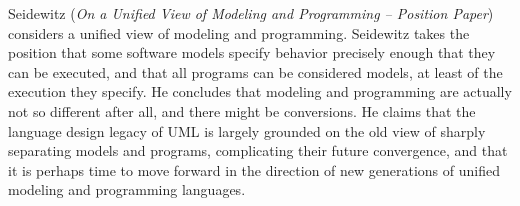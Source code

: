 


Seidewitz
\cite{isola-2016-seidewitz}
({\em On a Unified View of Modeling and Programming -- Position Paper})
considers a unified view of modeling and programming. 
Seidewitz takes the position that some software models specify behavior precisely enough that they can be executed, and that all programs can be considered models, at least of the execution they specify. He concludes that modeling and programming are actually not so different after all, and there might be conversions.  He claims that the language design legacy of UML is largely grounded on the old view of sharply separating models and programs, complicating their future convergence, and that it is perhaps time to move forward in the direction of new generations of unified modeling and programming languages.

